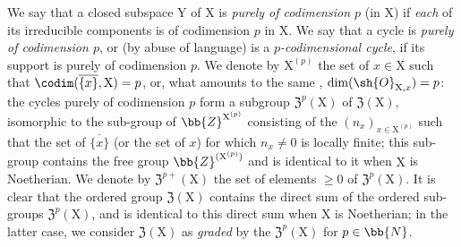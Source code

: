 \begin{env}[21.6.2]
\label{IV.21.6.2}
We say that a closed subspace $\mathrm{Y}$ of $\mathrm{X}$ is \emph{purely of codimension $p$} (in $\mathrm{X}$) if \emph{each} of its irreducible components is of codimension $p$ in $\mathrm{X}$.
We say that a cycle is \emph{purely of codimension $p$}, or (by abuse of language) is a \emph{$p$-codimensional cycle}, if its support is purely of codimension $p$.
We denote by $\mathrm{X}^{(p)}$ the set of $x\in\mathrm{X}$ such that $\codim(\overline{\{x\}},\mathrm{X})=p$, or, what amounts to the same ,{} $\dim(\sh{O}_{\mathrm{X},x})=p$:
the cycles purely of codimension $p$ form a subgroup $\mathfrak{Z}^p(\mathrm{X})$ of $\mathfrak{Z}(\mathrm{X})$, isomorphic to the sub-group of $\bb{Z}^{\mathrm{X}^{(p)}}$ consisting of the $(n_x)_{x\in\mathrm{X}^{(p)}}$ such that the set of $\overline{\{x\}}$ (or the set of $x$) for which $n_x\neq 0$ is locally finite;
this sub-group contains the free group $\bb{Z}^{(\mathrm{X}^{(p)})}$ and is identical to it when $\mathrm{X}$ is Noetherian.
We denote by $\mathfrak{Z}^{p+}(\mathrm{X})$ the set of elements $\geq 0$ of $\mathfrak{Z}^p(\mathrm{X})$.
It is clear that the ordered group $\mathfrak{Z}(\mathrm{X})$ contains the direct sum of the ordered sub-groups $\mathfrak{Z}^p(\mathrm{X})$, and is identical to this direct sum when $\mathrm{X}$ is Noetherian;
in the latter case, we consider $\mathfrak{Z}(\mathrm{X})$ as \emph{graded} by the $\mathfrak{Z}^p(\mathrm{X})$ for $p\in\bb{N}$.
\end{env}

